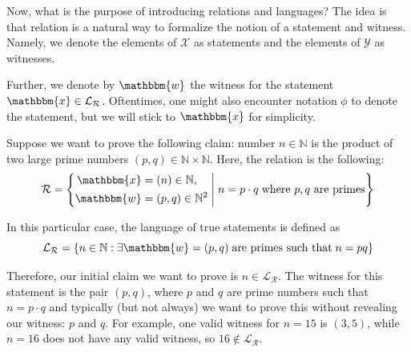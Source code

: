 \documentclass[../lecture-notes-148x210.tex]{subfiles}
\begin{document}
Now, what is the purpose of introducing relations and languages? The idea is
that relation is a natural way to formalize the notion of a statement and
witness. Namely, we denote the elements of $\mathcal{X}$ as statements and the
elements of $\mathcal{Y}$ as witnesses.

Further, we denote by $\mathbbm{w}$ the witness for the statement $\mathbbm{x}
\in \mathcal{L}_{\mathcal{R}}$. Oftentimes, one might also encounter notation
$\phi$ to denote the statement, but we will stick to $\mathbbm{x}$ for
simplicity.

\begin{example}
    Suppose we want to prove the following claim: number $n \in \mathbb{N}$ is
    the product of two large prime numbers $(p,q) \in \mathbb{N} \times
    \mathbb{N}$. Here, the relation is the following:
    \begin{equation*}
        \mathcal{R} = \left\{\begin{aligned}
            \mathbbm{x} &= (n) \in \mathbb{N}, \\ \mathbbm{w}&=(p,q) \in \mathbb{N}^2
        \end{aligned} \; \middle| \; n = p \cdot q \; \text{where $p,q$ are primes} \right\}
    \end{equation*}

    In this particular case, the language of true statements is defined as 
    \begin{equation*}
        \mathcal{L}_{\mathcal{R}} = \left\{n \in \mathbb{N}: \exists \mathbbm{w}=(p,q) \; \text{are primes such that}\; n = pq\right\}
    \end{equation*}
    
    Therefore, our initial claim we want to prove is $n \in
    \mathcal{L}_{\mathcal{R}}$. The witness for this statement is the pair
    $(p,q)$, where $p$ and $q$ are prime numbers such that $n = p \cdot q$ and
    typically (but not always) we want to prove this without revealing our
    witness: $p$ and $q$. For example, one valid witness for $n = 15$ is
    $(3,5)$, while $n=16$ does not have any valid witness, so $16 \not\in
    \mathcal{L}_{\mathcal{R}}$.
\end{example}
\end{document}
